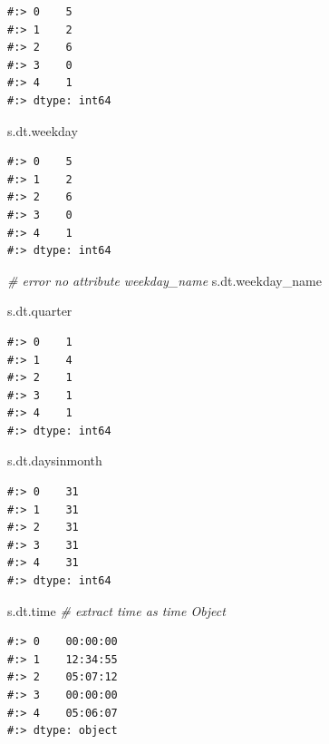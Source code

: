 \documentclass[
]{book}
\newenvironment{Shaded}{\begin{snugshade}}{\end{snugshade}}
\newcommand{\CommentTok}[1]{\textcolor[rgb]{0.37,0.37,0.37}{\textit{#1}}}
\newcommand{\NormalTok}[1]{#1}
\begin{document}
\begin{verbatim}
#:> 0    5
#:> 1    2
#:> 2    6
#:> 3    0
#:> 4    1
#:> dtype: int64
\end{verbatim}

\begin{Shaded}
\begin{Highlighting}[]
\NormalTok{s.dt.weekday}
\end{Highlighting}
\end{Shaded}

\begin{verbatim}
#:> 0    5
#:> 1    2
#:> 2    6
#:> 3    0
#:> 4    1
#:> dtype: int64
\end{verbatim}

\begin{Shaded}
\begin{Highlighting}[]
\CommentTok{# error no attribute weekday_name}
\NormalTok{s.dt.weekday_name}
\end{Highlighting}
\end{Shaded}

\begin{Shaded}
\begin{Highlighting}[]
\NormalTok{s.dt.quarter}
\end{Highlighting}
\end{Shaded}

\begin{verbatim}
#:> 0    1
#:> 1    4
#:> 2    1
#:> 3    1
#:> 4    1
#:> dtype: int64
\end{verbatim}

\begin{Shaded}
\begin{Highlighting}[]
\NormalTok{s.dt.daysinmonth}
\end{Highlighting}
\end{Shaded}

\begin{verbatim}
#:> 0    31
#:> 1    31
#:> 2    31
#:> 3    31
#:> 4    31
#:> dtype: int64
\end{verbatim}

\begin{Shaded}
\begin{Highlighting}[]
\NormalTok{s.dt.time   }\CommentTok{# extract time as time Object}
\end{Highlighting}
\end{Shaded}

\begin{verbatim}
#:> 0    00:00:00
#:> 1    12:34:55
#:> 2    05:07:12
#:> 3    00:00:00
#:> 4    05:06:07
#:> dtype: object
\end{verbatim}
\end{document}
